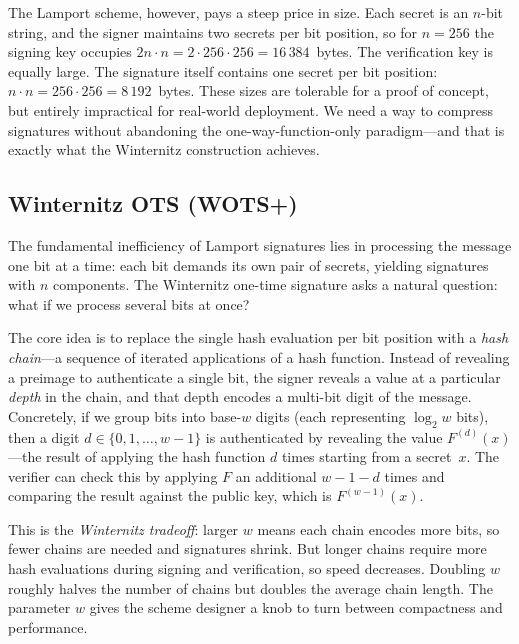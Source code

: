 The Lamport scheme, however, pays a steep price in size.  Each secret is an $n$-bit string, and the signer maintains two secrets per bit position, so for $n = 256$ the signing key occupies $2n \cdot n = 2 \cdot 256 \cdot 256 = 16\,384$~bytes.  The verification key is equally large.  The signature itself contains one secret per bit position: $n \cdot n = 256 \cdot 256 = 8\,192$~bytes.  These sizes are tolerable for a proof of concept, but entirely impractical for real-world deployment.  We need a way to compress signatures without abandoning the one-way-function-only paradigm---and that is exactly what the Winternitz construction achieves.


\subsection{Winternitz OTS (WOTS+)}
\label{subsec:wots}

The fundamental inefficiency of Lamport signatures lies in processing the message one bit at a time: each bit demands its own pair of secrets, yielding signatures with $n$ components.  The Winternitz one-time signature asks a natural question: what if we process several bits at once?

The core idea is to replace the single hash evaluation per bit position with a \emph{hash chain}---a sequence of iterated applications of a hash function.  Instead of revealing a preimage to authenticate a single bit, the signer reveals a value at a particular \emph{depth} in the chain, and that depth encodes a multi-bit digit of the message.  Concretely, if we group bits into base-$w$ digits (each representing $\log_2 w$ bits), then a digit $d \in \{0, 1, \ldots, w-1\}$ is authenticated by revealing the value $F^{(d)}(x)$---the result of applying the hash function $d$ times starting from a secret~$x$.  The verifier can check this by applying $F$ an additional $w - 1 - d$ times and comparing the result against the public key, which is $F^{(w-1)}(x)$.

This is the \emph{Winternitz tradeoff}: larger $w$ means each chain encodes more bits, so fewer chains are needed and signatures shrink.  But longer chains require more hash evaluations during signing and verification, so speed decreases.  Doubling $w$ roughly halves the number of chains but doubles the average chain length.  The parameter $w$ gives the scheme designer a knob to turn between compactness and performance.

